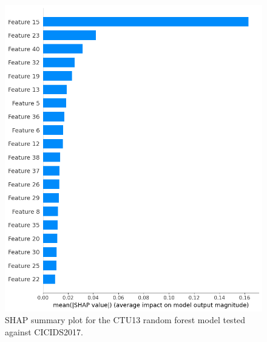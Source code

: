 \begin{figure}[H]
    \centering
    \includegraphics[width=1\textwidth]{img/SHAP_RFCTU13_CICIDS2017.png}
    \caption{SHAP summary plot for the CTU13 random forest model tested against CICIDS2017.}\label{fig:shap_rfc_ctu13_cicids2017}
\end{figure}

